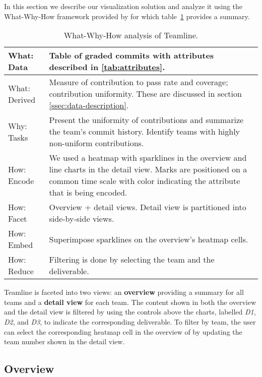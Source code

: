 \documentclass[../manifest.tex]{subfiles}
\begin{document}
In this section we describe our visualization solution and analyze it using the What-Why-How framework provided by \cite{Munzner:2014} for which table~\ref{tab:analysis} provides a summary.

\begin{table}
  \caption{What-Why-How analysis of Teamline.}
  \label{tab:analysis}
  \begin{tabularx}{\columnwidth}{ l | X }
    \hline
    What: Data & Table of graded commits with attributes described in \ref{tab:attributes}. \\
    \hline
    What: Derived & Measure of contribution to pass rate and coverage; contribution uniformity. These are discussed in section \ref{ssec:data-description}. \\
    \hline
    Why: Tasks & Present the uniformity of contributions and summarize the team's commit history. Identify teams with highly non-uniform contributions. \\
    \hline
    How: Encode & We used a heatmap with sparklines in the overview  and line charts in the detail view. Marks are positioned on a common time scale with color indicating the attribute that is being encoded.\\
    \hline
    How: Facet & Overview + detail views. Detail view is partitioned into side-by-side views. \\
    \hline
    How: Embed & Superimpose sparklines on the overview's heatmap cells. \\
    \hline
    How: Reduce & Filtering is done by selecting the team and the deliverable. \\
    \hline
  \end{tabularx}
\end{table}

Teamline is faceted into two views: an \textbf{overview} providing a summary for all teams and a \textbf{detail view} for each team. The content shown in both the overview and the detail view is filtered by using the controls above the charts, labelled \textit{D1}, \textit{D2}, and \textit{D3}, to indicate the corresponding deliverable. To filter by team, the user can select the corresponding heatmap cell in the overview of by updating the team number shown in the detail view.

\subsection{Overview}
\end{document}
